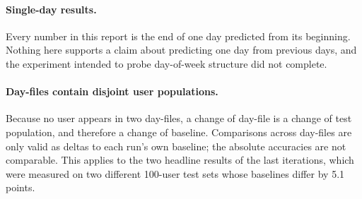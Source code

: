 \paragraph{Single-day results.} Every number in this report is the end of one day
predicted from its beginning. Nothing here supports a claim about predicting one
day from previous days, and the experiment intended to probe day-of-week
structure did not complete.

\paragraph{Day-files contain disjoint user populations.} Because no user appears
in two day-files, a change of day-file is a change of test population, and
therefore a change of baseline. Comparisons across day-files are only valid as
deltas to each run's own baseline; the absolute accuracies are not comparable.
This applies to the two headline results of the last iterations, which were
measured on two different 100-user test sets whose baselines differ by 5.1
points.
